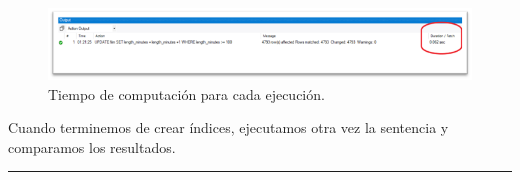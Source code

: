 \documentclass[a4paper]{article}
\begin{document}
\begin{figure}[ht]
    \centering
    \includegraphics[width=0.9\columnwidth]{figs/tiempoEjecucion.png}
    \caption{Tiempo de computación para cada ejecución.}\label{fig:tiempoEjecucion}
\end{figure}

Cuando terminemos de crear índices, ejecutamos otra vez la sentencia y comparamos los resultados.

\vspace{5em}
\hrule
\doclicenseThis
\end{document}
